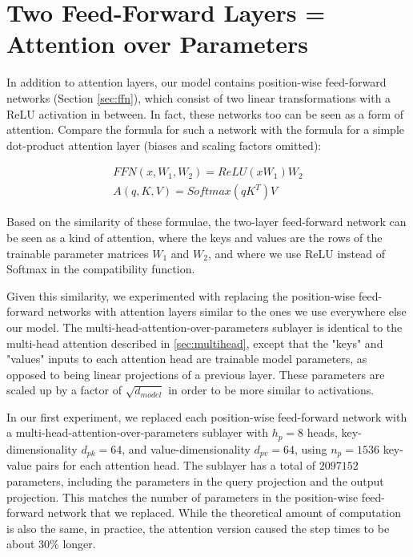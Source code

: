 \pagebreak
\section*{Two Feed-Forward Layers = Attention over Parameters}\label{sec:parameter_attention}

In addition to attention layers, our model contains position-wise feed-forward networks (Section \ref{sec:ffn}), which consist of two linear transformations with a ReLU activation in between.  In fact, these networks too can be seen as a form of attention.  Compare the formula for such a network with the formula for a simple dot-product attention layer (biases and scaling factors omitted):

\begin{align*}
    FFN(x, W_1, W_2) = ReLU(xW_1)W_2 \\
    A(q, K, V) = Softmax(qK^T)V
\end{align*}

Based on the similarity of these formulae, the two-layer feed-forward network can be seen as a kind of attention, where the keys and values are the rows of the trainable parameter matrices $W_1$ and $W_2$, and where we use ReLU instead of Softmax in the compatibility function.


Given this similarity, we experimented with replacing the position-wise feed-forward networks with attention layers similar to the ones we use everywhere else our model. The multi-head-attention-over-parameters sublayer is identical to the multi-head attention described in \ref{sec:multihead}, except that the "keys" and "values" inputs to each attention head are trainable model parameters, as opposed to being linear projections of a previous layer.  These parameters are scaled up by a factor of $\sqrt{d_{model}}$ in order to be more similar to activations.

In our first experiment, we replaced each position-wise feed-forward network with a multi-head-attention-over-parameters sublayer with $h_p=8$ heads, key-dimensionality $d_{pk}=64$, and value-dimensionality $d_{pv}=64$, using $n_p=1536$ key-value pairs for each attention head.  The sublayer has a total of $2097152$ parameters, including the parameters in the query projection and the output projection.  This matches the number of parameters in the position-wise feed-forward network that we replaced.  While the theoretical amount of computation is also the same, in practice, the attention version caused the step times to be about 30\% longer.

